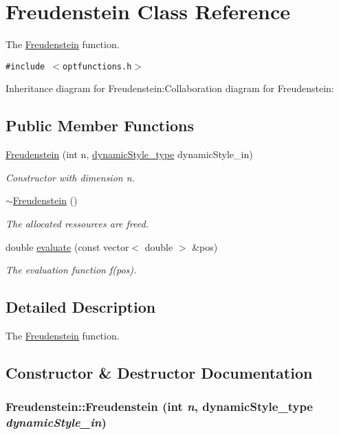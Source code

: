 \hypertarget{classFreudenstein}{
\section{Freudenstein Class Reference}
\label{classFreudenstein}
}
The \hyperlink{classFreudenstein}{Freudenstein} function.  


{\tt \#include $<$optfunctions.h$>$}

Inheritance diagram for Freudenstein:Collaboration diagram for Freudenstein:\subsection*{Public Member Functions}
\begin{CompactItemize}
\item 
\hyperlink{classFreudenstein_61a9b65e9648a35fde87f46f06cade0a}{Freudenstein} (int n, \hyperlink{optfunctions_8h_ae9aa3a5dd199a43e77abc2cccf4477e}{dynamicStyle\_\-type} dynamicStyle\_\-in)
\begin{CompactList}\small\item\em Constructor with dimension n. \item\end{CompactList}\item 
\hyperlink{classFreudenstein_21fb742403e74470c12fa000e90ddc98}{$\sim$Freudenstein} ()
\begin{CompactList}\small\item\em The allocated ressources are freed. \item\end{CompactList}\item 
double \hyperlink{classFreudenstein_0ab476b270de17051b8d8c1174c1990d}{evaluate} (const vector$<$ double $>$ \&pos)
\begin{CompactList}\small\item\em The evaluation function f(pos). \item\end{CompactList}\end{CompactItemize}


\subsection{Detailed Description}
The \hyperlink{classFreudenstein}{Freudenstein} function. 

\subsection{Constructor \& Destructor Documentation}
\hypertarget{classFreudenstein_61a9b65e9648a35fde87f46f06cade0a}{
\subsubsection{\setlength{\rightskip}{0pt plus 5cm}Freudenstein::Freudenstein (int {\em n}, \/  {\bf dynamicStyle\_\-type} {\em dynamicStyle\_\-in})}}
\label{classFreudenstein_61a9b65e9648a35fde87f46f06cade0a}


